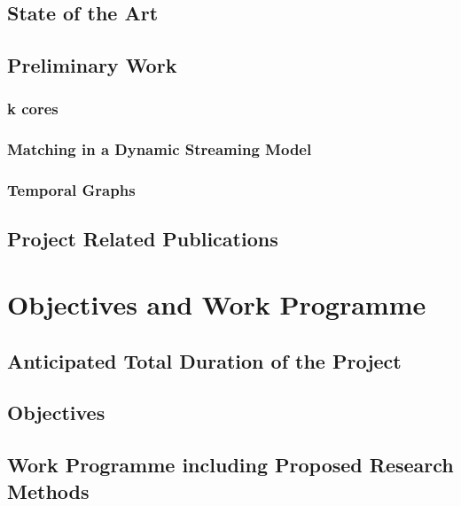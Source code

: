 \documentclass{scrartcl}
\begin{document}
\subsection{State of the Art}



\subsection{Preliminary Work}



\subsubsection {k cores }
\subsubsection {Matching in a Dynamic Streaming Model}
\subsubsection {Temporal Graphs }

\subsection{Project Related Publications}

\section{Objectives and Work Programme}
\subsection{Anticipated Total Duration of the Project}
\subsection{Objectives}
\subsection{Work Programme including Proposed Research Methods}
\end{document}
